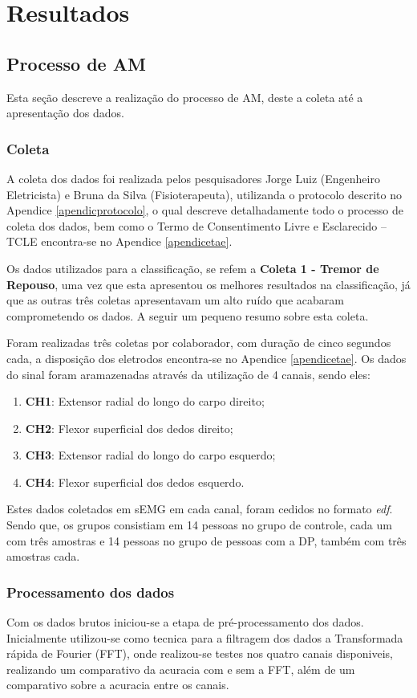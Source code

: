 \chapter{Resultados}
\label{ch:Resultados}
\section{Processo de AM}
Esta seção descreve a realização do processo de AM, deste a coleta até a apresentação dos dados.
\subsection{Coleta}
A coleta dos dados foi realizada pelos pesquisadores Jorge Luiz (Engenheiro Eletricista) e Bruna da Silva (Fisioterapeuta), utilizanda o protocolo descrito no Apendice \ref{apendicprotocolo}, o qual descreve detalhadamente todo o processo de coleta dos dados, bem como o Termo de Consentimento Livre e Esclarecido – TCLE encontra-se no  Apendice \ref{apendicetae}.

Os dados utilizados para a classificação, se refem a \textbf{Coleta 1 - Tremor de Repouso}, uma vez que esta apresentou os melhores resultados na classificação, já que as outras três coletas apresentavam um alto ruído que acabaram comprometendo os dados. A seguir um pequeno resumo sobre esta coleta.

Foram realizadas três coletas por colaborador, com duração de cinco segundos cada, a disposição dos eletrodos encontra-se no Apendice \ref{apendicetae}. Os dados do sinal foram aramazenadas através da utilização de 4 canais, sendo eles:
\begin{enumerate}
	\item \textbf{CH1}: Extensor radial do longo do carpo direito;
	\item \textbf{CH2}: Flexor superficial dos dedos direito;
	\item \textbf{CH3}: Extensor radial do longo do carpo esquerdo;
	\item \textbf{CH4}: Flexor superficial dos dedos esquerdo.
\end{enumerate}

Estes dados coletados em sEMG em cada canal, foram cedidos no formato \textit{edf}. Sendo que, os grupos consistiam em 14 pessoas no grupo de controle, cada um com três amostras e 14 pessoas no grupo de pessoas com a DP, também com três amostras cada.

\subsection{Processamento dos dados}
Com os dados brutos iniciou-se a etapa de pré-processamento dos dados. Inicialmente utilizou-se como tecnica para a filtragem dos dados a Transformada rápida de Fourier (FFT), onde realizou-se testes nos quatro canais disponiveis, realizando um comparativo da acuracia com e sem a FFT, além de um comparativo sobre a acuracia entre os canais.

